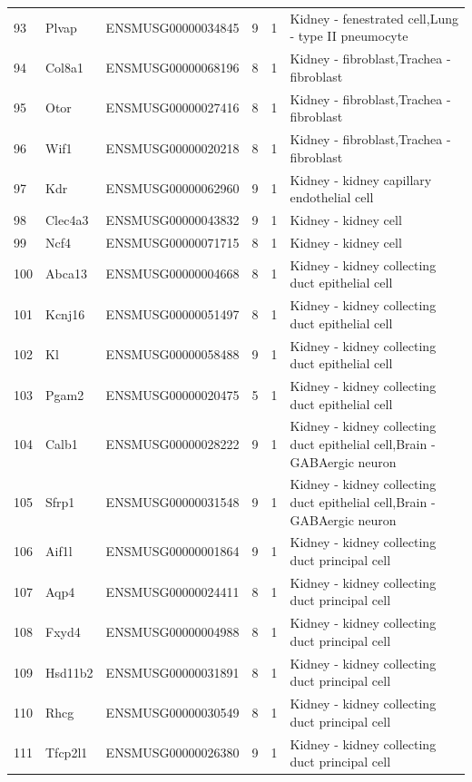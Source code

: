 \begin{table}[ht]
{\begin{tabular}{lllrrl}
        93 & Plvap & ENSMUSG00000034845 & 9 & 1 & Kidney - fenestrated cell,Lung - type II pneumocyte \\
        94 & Col8a1 & ENSMUSG00000068196 & 8 & 1 & Kidney - fibroblast,Trachea - fibroblast \\
        95 & Otor & ENSMUSG00000027416 & 8 & 1 & Kidney - fibroblast,Trachea - fibroblast \\
        96 & Wif1 & ENSMUSG00000020218 & 8 & 1 & Kidney - fibroblast,Trachea - fibroblast \\
        97 & Kdr & ENSMUSG00000062960 & 9 & 1 & Kidney - kidney capillary endothelial cell \\
        98 & Clec4a3 & ENSMUSG00000043832 & 9 & 1 & Kidney - kidney cell \\
        99 & Ncf4 & ENSMUSG00000071715 & 8 & 1 & Kidney - kidney cell \\
        100 & Abca13 & ENSMUSG00000004668 & 8 & 1 & Kidney - kidney collecting duct epithelial cell \\
        101 & Kcnj16 & ENSMUSG00000051497 & 8 & 1 & Kidney - kidney collecting duct epithelial cell \\
        102 & Kl & ENSMUSG00000058488 & 9 & 1 & Kidney - kidney collecting duct epithelial cell \\
        103 & Pgam2 & ENSMUSG00000020475 & 5 & 1 & Kidney - kidney collecting duct epithelial cell \\
        104 & Calb1 & ENSMUSG00000028222 & 9 & 1 & Kidney - kidney collecting duct epithelial cell,Brain - GABAergic neuron \\
        105 & Sfrp1 & ENSMUSG00000031548 & 9 & 1 & Kidney - kidney collecting duct epithelial cell,Brain - GABAergic neuron \\
        106 & Aif1l & ENSMUSG00000001864 & 9 & 1 & Kidney - kidney collecting duct principal cell \\
        107 & Aqp4 & ENSMUSG00000024411 & 8 & 1 & Kidney - kidney collecting duct principal cell \\
        108 & Fxyd4 & ENSMUSG00000004988 & 8 & 1 & Kidney - kidney collecting duct principal cell \\
        109 & Hsd11b2 & ENSMUSG00000031891 & 8 & 1 & Kidney - kidney collecting duct principal cell \\
        110 & Rhcg & ENSMUSG00000030549 & 8 & 1 & Kidney - kidney collecting duct principal cell \\
        111 & Tfcp2l1 & ENSMUSG00000026380 & 9 & 1 & Kidney - kidney collecting duct principal cell \\

\end{tabular}}
\end{table}
